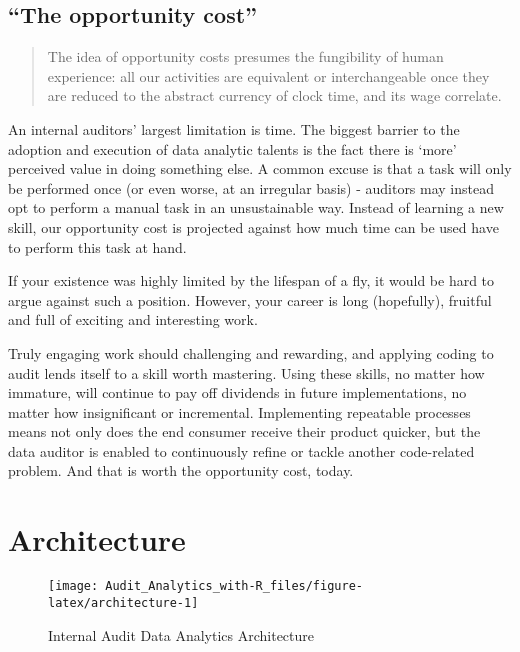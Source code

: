 \documentclass[
]{book}
\begin{document}
\hypertarget{the-opportunity-cost}{%
\section{``The opportunity cost''}\label{the-opportunity-cost}}

\begin{quote}
The idea of opportunity costs presumes the fungibility of human experience: all our activities are equivalent or interchangeable once they are reduced to the abstract currency of clock time, and its wage correlate. \citep{shop-class}
\end{quote}

An internal auditors' largest limitation is time. The biggest barrier to the adoption and execution of data analytic talents is the fact there is `more' perceived value in doing something else. A common excuse is that a task will only be performed once (or even worse, at an irregular basis) - auditors may instead opt to perform a manual task in an unsustainable way. Instead of learning a new skill, our opportunity cost is projected against how much time can be used have to perform this task at hand.

If your existence was highly limited by the lifespan of a fly, it would be hard to argue against such a position. However, your career is long (hopefully), fruitful and full of exciting and interesting work.

Truly engaging work should challenging and rewarding, and applying coding to audit lends itself to a skill worth mastering. Using these skills, no matter how immature, will continue to pay off dividends in future implementations, no matter how insignificant or incremental. Implementing repeatable processes means not only does the end consumer receive their product quicker, but the data auditor is enabled to continuously refine or tackle another code-related problem. And that is worth the opportunity cost, today.

\hypertarget{architecture}{%
\chapter{Architecture}\label{architecture}}

\begin{figure}

{\centering \texttt{[image: Audit\_Analytics\_with-R\_files/figure-latex/architecture-1]} 

}

\caption{Internal Audit Data Analytics Architecture}\label{fig:architecture}
\end{figure}
\end{document}
